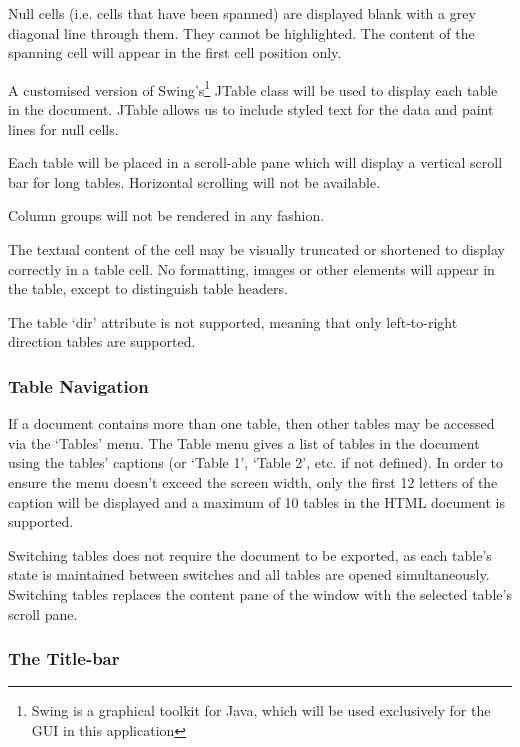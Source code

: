 Null cells (i.e. cells that have been spanned) are displayed blank with a grey
diagonal line through them. They cannot be highlighted. The content of the
spanning cell will appear in the first cell position only.


A customised version of Swing's\footnote{Swing is a graphical toolkit for Java,
which will be used exclusively for the GUI in this application} JTable class
will be used to display each table in the document. JTable allows us to include
styled text for the data and paint lines for null cells.

Each table will be placed in a scroll-able pane which will display a vertical
scroll bar for long tables. Horizontal scrolling will not be available.

Column groups will not be rendered in any fashion.

The textual content of the cell may be visually truncated or shortened to
display correctly in a table cell. No formatting, images or other elements will
appear in the table, except to distinguish table headers.

The table `dir' attribute is not supported, meaning that only left-to-right
direction tables are supported.

\subsubsection{Table Navigation}

If a document contains more than one table, then other tables may be accessed
via the `Tables' menu. The Table menu gives a list of tables in the document
using the tables' captions (or `Table 1', `Table 2', etc. if not defined). In
order to ensure the menu doesn't exceed the screen width, only the first
12 letters of the caption will be displayed and a maximum of 10 tables in the
HTML document is supported.

Switching tables does not require the document to be exported, as each table's
state is maintained between switches and all tables are opened simultaneously.
Switching tables replaces the content pane of the window with the selected
table's scroll pane.

\subsubsection{The Title-bar}

